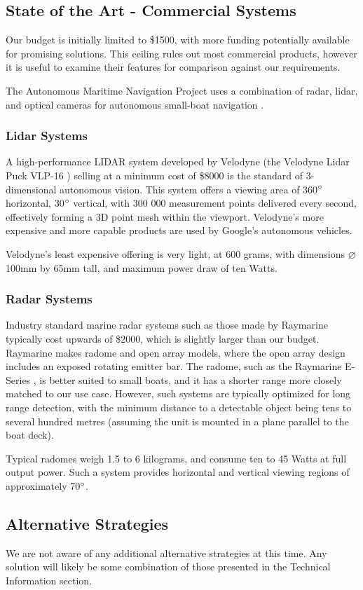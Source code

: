 \subsection{\label{sec:intro:commercial}State of the Art - Commercial Systems}
Our budget is initially limited to \$1500, with more funding potentially available for promising solutions. This ceiling rules out most commercial products, however it is useful to examine their features for comparison against our requirements.

The Autonomous Maritime Navigation Project uses a combination of radar, lidar, and optical cameras for autonomous small-boat navigation \cite{AMN}.


\subsubsection{\label{sec:intro:commercial:lidar}Lidar Systems}
A high-performance LIDAR system developed by Velodyne (the Velodyne Lidar Puck VLP-16 \cite{velodyne-vlp16}) selling at a minimum cost of \$8000 is the standard of 3-dimensional autonomous vision. This system offers a viewing area of 360$\degree$ horizontal, 30$\degree$ vertical, with 300 000 measurement points delivered every second, effectively forming a 3D point mesh within the viewport. Velodyne's more expensive and more capable products are used by Google's autonomous vehicles.

Velodyne's least expensive offering is very light, at 600 grams, with dimensions $\varnothing$100mm by 65mm tall, and maximum power draw of ten Watts.


\subsubsection{\label{sec:intro:commercial:radar}Radar Systems}
Industry standard marine radar systems such as those made by Raymarine typically cost upwards of \$2000, which is slightly larger than our budget. Raymarine makes radome and open array models, where the open array design includes an exposed rotating emitter bar. The radome, such as the Raymarine E-Series \cite{raymarine-eseries}, is better suited to small boats, and it has a shorter range more closely matched to our use case. However, such systems are typically optimized for long range detection, with the minimum distance to a detectable object being tens to several hundred metres (assuming the unit is mounted in a plane parallel to the boat deck).

Typical radomes weigh 1.5 to 6 kilograms, and consume ten to 45 Watts at full output power. Such a system provides horizontal and vertical viewing regions of approximately 70$\degree$.


\subsection{\label{sec:intro:alternatives}Alternative Strategies}
We are not aware of any additional alternative strategies at this time. Any solution will likely be some combination of those presented in the Technical Information section.
